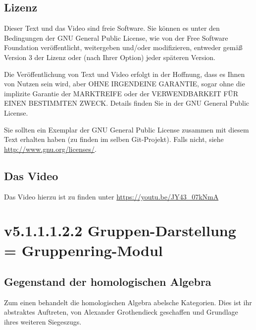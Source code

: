 \documentclass[a4paper]{amsart}
\theoremstyle{definition}
\begin{document}
\subsection*{Lizenz}
Dieser Text und das Video sind freie Software. Sie können es unter den Bedingungen der
GNU General Public License, wie von der Free Software Foundation veröffentlicht, weitergeben
und/oder modifizieren, entweder gemäß Version 3 der Lizenz oder (nach Ihrer Option) jeder späteren Version.

Die Veröffentlichung von Text und Video erfolgt in der Hoffnung, dass es Ihnen von Nutzen sein wird,
aber OHNE IRGENDEINE GARANTIE, sogar ohne die implizite Garantie der MARKTREIFE oder der
VERWENDBARKEIT FÜR EINEN BESTIMMTEN ZWECK. Details finden Sie in der GNU General Public License.

Sie sollten ein Exemplar der GNU General Public License zusammen mit diesem Text erhalten haben
(zu finden im selben Git-Projekt).
Falls nicht, siehe \url{http://www.gnu.org/licenses/}.

\subsection*{Das Video}
Das Video hierzu ist zu finden unter
{\tiny
   \url{https://youtu.be/JY43_07kNmA}
}

\section{v5.1.1.1.2.2 Gruppen-Darstellung = Gruppenring-Modul}

\subsection{Gegenstand der homologischen Algebra}
Zum einen behandelt die homologischen Algebra abelsche Kategorien. Dies ist ihr abstraktes Auftreten, von Alexander Grothendieck geschaffen und Grundlage ihres weiteren Siegeszugs.
\end{document}
